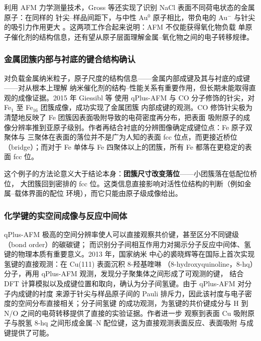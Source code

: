 利用 AFM 力学测量技术，Gross 等还实现了识别 NaCl 表面不同荷电状态的金属原子：在同样的
针尖--样品间距下，与中性 Au$^{0}$ 原子相比，带负电的 Au$^{-}$ 与针尖的吸引力作用更大
。这两项工作合起来说明：AFM 不仅能获得氧化物负载
单原子催化剂的结构信息，还有望从原子层面理解金属--氧化物之间的电子转移规律。

\subsubsection{金属团簇内部与衬底的键合结构确认}

对负载金属纳米粒子，原子尺度的结构信息——金属内部成键及其与衬底的成键——对从根本上理解
纳米催化剂的结构--性能关系有重要作用，但长期未能取得直观的成像证据。2015 年 Giessibl 等
使用 qPlus-AFM 与 CO 分子修饰的针尖，对 Fe$_1$ 至 Fe$_{16}$ 团簇成像，成功实现了金属团簇
内部成键的观测。CO 修饰针尖极为清楚地反映了 Fe 团簇因表面吸附导致的电荷密度再分布，把表面
吸附原子的成像分辨率推到亚原子级别。作者再结合衬底的分辨图像确定成键位点：Fe 原子双聚体与
三聚体在表面的落位并不是广为人知的表面 fcc 位点，而更接近桥位（bridge）；而对于 Fe 单体与
Fe 四聚体以上的团簇，所有 Fe 都落在更稳定的表面 fcc 位。

这个例子的方法论意义大于结论本身：\textbf{团簇尺寸改变落位}——小团簇落在低配位桥位，
大团簇回到密排的 fcc 位。这类信息直接影响对活性位结构的判断（例如金属--载体界面的配位
环境），而它只能由原子级成像给出。

\subsubsection{化学键的实空间成像与反应中间体}

qPlus-AFM 极高的空间分辨率使人可以直接观察共价键，甚至区分不同键级（bond order）的碳碳键；
而识别分子间相互作用力对揭示分子反应中间体、氢键的物理本质有重要意义。2013 年，国家纳米
中心的裘晓辉等在国际上首次实现氢键的直接观测：在 Cu(111) 表面沉积 8-羟基喹啉
（8-hydroxyquinoline，8-hq）分子，再用 qPlus-AFM 观测，发现分子聚集体之间形成了可观测的键，
结合 DFT 计算模拟以及成键位置和取向，确认为分子间氢键。由于 qPlus-AFM 对分子内成键的衬度
来源于针尖与样品原子间的 Pauli 排斥力，因此该衬度与电子密度的空间分布直接相关；分子间氢键
的成功观测，为氢键的共价键成分与 H 到 N/O 之间的电荷转移提供了直接的实验证据。作者进一步
观察到表面 Cu 吸附原子与脱氢 8-hq 之间形成金属--N 配位键，这为直接观测表面反应、表面吸附
与成键提供了可能。


